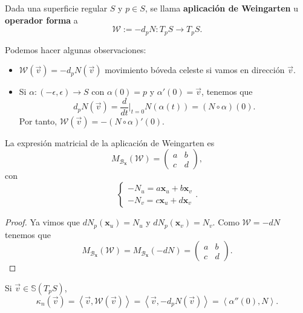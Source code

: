 \begin{definition}
Dada una superficie regular $\displaystyle S $ y $\displaystyle p \in S $, se llama \textbf{aplicación de Weingarten} u \textbf{operador forma} a 
\[\mathcal{W} := - d _{p}N : T _{p}S \to T_{p} S .\]
\end{definition}
\begin{observation}
Podemos hacer algunas observaciones:
\begin{itemize}
\item $\displaystyle \mathcal{W}\left(\vec{v}\right)=-d _{p}N\left(\vec{v}\right) $ movimiento bóveda celeste si vamos en dirección $\displaystyle \vec{v} $.
\item Si $\displaystyle \alpha: \left(-\epsilon , \epsilon \right)\to S $ con $\displaystyle \alpha\left(0\right)=p $ y $\displaystyle \alpha'\left(0\right)=\vec{v} $, tenemos que 
	\[d _{p}N\left(\vec{v}\right)=\frac{d}{dt}|_{t = 0}N\left(\alpha\left(t\right)\right)= \left(N\circ \alpha \right)\left(0\right) .\]
	Por tanto, $\displaystyle \mathcal{W}\left(\vec{v}\right)=-\left(N\circ \alpha \right)'\left(0\right) $. 
\end{itemize}
\end{observation}
\begin{prop}
La expresión matricial de la aplicación de Weingarten es 
\[M_{\mathcal{B}_{ \textbf{x} }}\left(\mathcal{W}\right) = \begin{pmatrix} a & b \\ c & d \end{pmatrix} ,\]
con 
\[
\begin{cases}
-N_{u} = a \textbf{x} _{u} + b \textbf{x} _{v} \\
-N_{ v} = c \textbf{x} _{u} + d \textbf{x} _{v}
\end{cases}
.\]
\end{prop}
\begin{proof}
Ya vimos que $\displaystyle dN_{p}\left( \textbf{x} _{u}\right)=N_{u} $ y $\displaystyle dN_{p}\left( \textbf{x} _{v}\right)=N_{v} $. Como $\displaystyle \mathcal{W}=-dN $ tenemos que  
\[M_{\mathcal{B}_{ \textbf{x} }}\left(\mathcal{W}\right) = M_{ \mathcal{B}_{ \textbf{x} }}\left(-dN\right)=\begin{pmatrix} a & b \\ c & d \end{pmatrix}.\]
\end{proof}
\begin{theorem}
Si $\displaystyle \vec{v}\in \mathbb{S}\left(T_{p}S\right) $, 
\[\kappa_{n}\left(\vec{v}\right)=\left\langle \vec{v}, \mathcal{W}\left(\vec{v}\right) \right\rangle =\left\langle \vec{v}, - d _{p}N\left(\vec{v}\right) \right\rangle = \left\langle \alpha''\left(0\right), N \right\rangle   .\]
\end{theorem}
